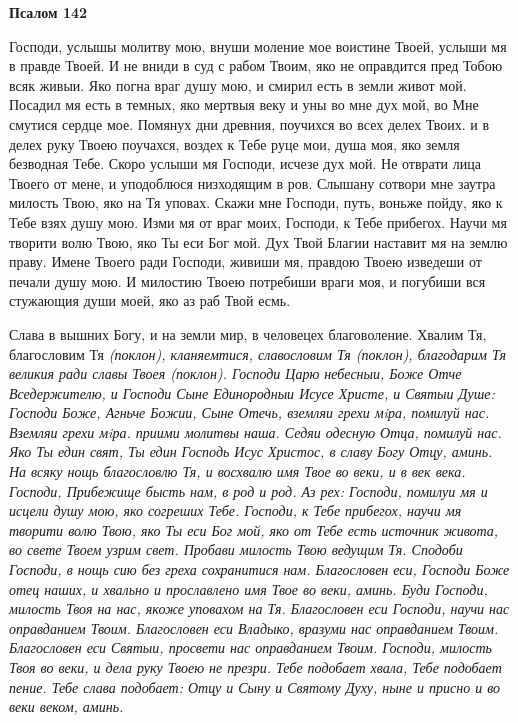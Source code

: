  

\bfseries Псалом 142\normalfont{}


   Господи, услышы молитву мою, внуши моление мое воистине Твоей,
услыши мя в правде Твоей. И не вниди в суд с рабом Твоим, яко не
оправдится пред Тобою всяк живыи. Яко погна враг душу мою, и смирил
есть в земли живот мой. Посадил мя есть в темных, яко мертвыя веку и уны
во мне дух мой, во Мне смутися сердце мое. Помянух дни древния, поучихся
во всех делех Твоих. и в делех руку Твоею поучахся, воздех к Тебе
руце мои, душа моя, яко земля безводная Тебе. Скоро услыши мя
Господи, исчезе дух мой. Не отврати лица Твоего от мене, и уподоблюся
низходящим в ров. Слышану сотвори мне заутра милость Твою, яко на Тя
уповах. Скажи мне Господи, путь, воньже пойду, яко к Тебе взях душу
мою. Изми мя от враг моих, Господи, к Тебе прибегох. Научи мя
творити волю Твою, яко Ты еси Бог мой. Дух Твой Благии наставит мя
на землю праву. Имене Твоего ради Господи, живиши мя, правдою
Твоею изведеши от печали душу мою. И милостию Твоею потребиши
враги моя, и погубиши вся стужающия души моей, яко аз раб Твой
есмь.


   Слава в вышних Богу, и на земли мир, в человецех благоволение. Хвалим
Тя, благословим Тя \itshape (поклон)\normalfont{}, кланяемтися, славословим Тя \itshape (поклон)\normalfont{},
благодарим Тя великия ради славы Твоея \itshape (поклон)\normalfont{}. Господи Царю небесныи,
Боже Отче Вседержителю, и Господи Сыне Единородныи Исусе Христе, и
Святыи Душе: Господи Боже, Агньче Божии, Сыне Отечь, вземляи грехи
мiра, помилуй нас. Вземляи грехи мiра. приими молитвы наша. Седяи
одесную Отца, помилуй нас. Яко Ты един свят, Ты един Господь Исус
Христос, в славу Богу Отцу, аминь. На всяку нощь благословлю Тя, и
восхвалю имя Твое во веки, и в век века. Господи, Прибежище бысть нам, в
род и род. Аз рех: Господи, помилуи мя и исцели душу мою, яко согреших
Тебе. Господи, к Тебе прибегох, научи мя творити волю Твою, яко
Ты еси Бог мой, яко от Тебе есть источник живота, во свете Твоем
узрим свет. Пробави милость Твою ведущим Тя. Сподоби Господи, в
нощь сию без греха сохранитися нам. Благословен еси, Господи Боже
отец наших, и хвально и прославлено имя Твое во веки, аминь. Буди
Господи, милость Твоя на нас, якоже уповахом на Тя. Благословен еси
Господи, научи нас оправданием Твоим. Благословен еси Владыко,
вразуми нас оправданием Твоим. Благословен еси Святыи, просвети нас
оправданием Твоим. Господи, милость Твоя во веки, и дела руку Твоею
не презри. Тебе подобает хвала, Тебе подобает пение. Тебе слава
подобает: Отцу и Сыну и Святому Духу, ныне и присно и во веки веком,
аминь.


